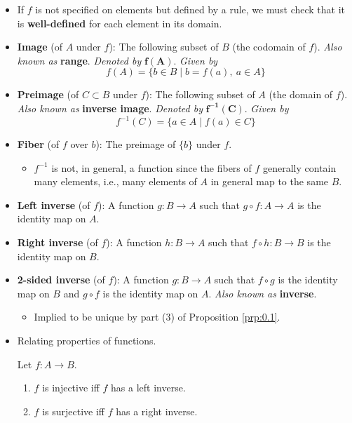 \documentclass[../notes.tex]{subfiles}
\begin{document}
\begin{itemize}
    \item If $f$ is not specified on elements but defined by a rule, we must check that it is \textbf{well-defined} for each element in its domain.
    \item \textbf{Image} (of $A$ under $f$): The following subset of $B$ (the codomain of $f$). \emph{Also known as} \textbf{range}. \emph{Denoted by} $\bm{f(A)}$. \emph{Given by}
    \begin{equation*}
        f(A) = \{b\in B\mid b=f(a),\ a\in A\}
    \end{equation*}
    \item \textbf{Preimage} (of $C\subset B$ under $f$): The following subset of $A$ (the domain of $f$). \emph{Also known as} \textbf{inverse image}. \emph{Denoted by} $\bm{f^{-1}(C)}$. \emph{Given by}
    \begin{equation*}
        f^{-1}(C) = \{a\in A\mid f(a)\in C\}
    \end{equation*}
    \item \textbf{Fiber} (of $f$ over $b$): The preimage of $\{b\}$ under $f$.
    \begin{itemize}
        \item $f^{-1}$ is not, in general, a function since the fibers of $f$ generally contain many elements, i.e., many elements of $A$ in general map to the same $B$.
    \end{itemize}
    \item \textbf{Left inverse} (of $f$): A function $g:B\to A$ such that $g\circ f:A\to A$ is the identity map on $A$.
    \item \textbf{Right inverse} (of $f$): A function $h:B\to A$ such that $f\circ h:B\to B$ is the identity map on $B$.
    \item \textbf{2-sided inverse} (of $f$): A function $g:B\to A$ such that $f\circ g$ is the identity map on $B$ and $g\circ f$ is the identity map on $A$. \emph{Also known as} \textbf{inverse}.
    \begin{itemize}
        \item Implied to be unique by part (3) of Proposition \ref{prp:0.1}.
    \end{itemize}
    \item Relating properties of functions.
    \begin{proposition}\label{prp:0.1}
        Let $f:A\to B$.
        \begin{enumerate}
            \item $f$ is injective iff $f$ has a left inverse.
            \item $f$ is surjective iff $f$ has a right inverse.

\end{enumerate}
\end{proposition}
\end{itemize}
\end{document}
